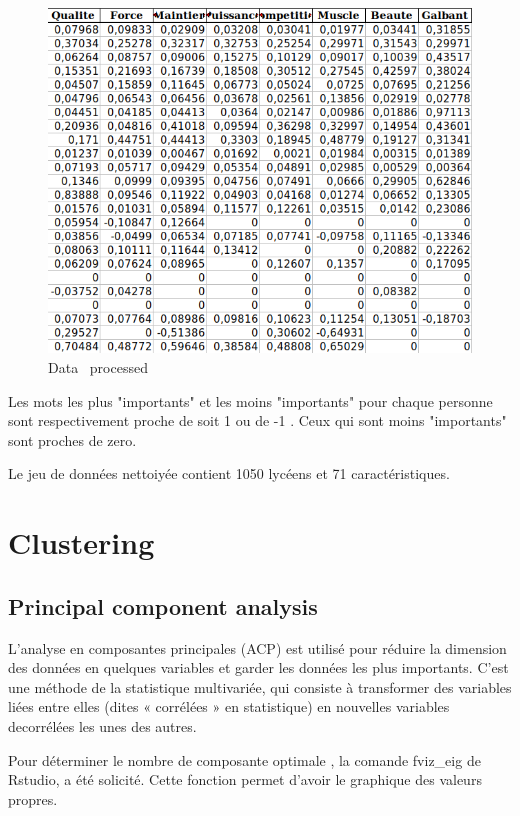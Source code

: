 \documentclass[12pt]{article}
\begin{document}
\begin{figure}[h]
\begin{center}
\includegraphics[scale=0.7]{donnée_nettoyé.png} 
\caption[]{Data \ processed }
\end{center}
\end{figure}



Les mots les plus "importants"  et les moins "importants" pour chaque personne sont respectivement proche de soit 1 ou de -1 . Ceux qui  sont  moins "importants" sont proches de zero.

Le jeu de données nettoiyée contient 1050
lycéens et 71 caractéristiques.


\section{Clustering} 


\subsection{Principal component analysis}

L'analyse en composantes principales (ACP) est utilisé pour réduire la dimension des données en quelques variables et garder les données les plus importants. C'est une méthode de la statistique multivariée, qui consiste à transformer des variables liées entre elles (dites « corrélées » en statistique) en nouvelles variables decorrélées les unes des autres. 

Pour déterminer le nombre de composante optimale , la comande fviz\_eig de Rstudio, a été solicité. Cette fonction permet d'avoir le graphique des valeurs propres.
\end{document}
